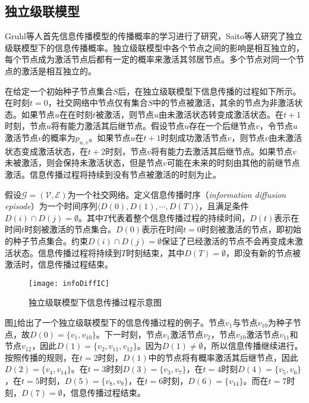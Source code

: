 \subsection{独立级联模型}
\label{subsec5:icModel}
Gruhl等人首先信息传播模型的传播概率的学习进行了研究，Saito等人研究了独立级联模型下的信息传播概率。独立级联模型中各个节点之间的影响是相互独立的，每个节点成为激活节点后都有一定的概率来激活其邻居节点。多个节点对同一个节点的激活是相互独立的。

在给定一个初始种子节点集合$S$后，在独立级联模型下信息传播的过程如下所示。在时刻$t=0$，社交网络中节点仅有集合$S$中的节点被激活，其余的节点为非激活状态。如果节点$u$在在时刻$t$被激活，则节点$u$由未激活状态转变成激活状态。在$t+1$时刻，节点$u$将有能力激活其后继节点。假设节点$u$存在一个后继节点$v$，令节点$u$激活节点$v$的概率为$p_{u,v}$。如果节点$u$在$t+1$时刻成功激活节点$v$，则节点$v$由未激活状态变成激活状态，在$t+2$时刻，节点$v$将有能力去激活其后继节点。如果节点$v$未被激活，则会保持未激活状态，但是节点$v$可能在未来的时刻由其他的前继节点激活。信息传播过程将持续到没有节点被激活的时刻为止。

假设$\mathcal{G}=\left(\mathcal{V},\mathcal{E}\right)$为一个社交网络。定义信息传播时序（\textit{information diffusion episode}）为一个时间序列$\langle D\left(0\right), D\left(1\right), \cdots, D\left(T\right) \rangle$，且满足条件$D\left(i\right) \cap D\left(j\right) = \emptyset$。其中$T$代表着整个信息传播过程的持续时间，$D\left(t\right)$表示在时间$t$时刻被激活的节点集合。$D\left(0\right)$表示在时间$t=0$时刻被激活的节点，即初始的种子节点集合。约束$D\left(i\right) \cap D\left(j\right) = \emptyset$保证了已经激活的节点不会再变成未激活状态。信息传播过程将持续到$T$时刻结束，其中$D\left(T\right) = \emptyset$，即没有新的节点被激活时，信息传播过程结束。

\begin{figure}[!ht]
    \centering
    \texttt{[image: infoDiffIC]}
    \caption{独立级联模型下信息传播过程示意图}
    \label{fig:infoDiffIC}
\end{figure}

图\ref{fig:infoDiffIC}给出了一个独立级联模型下的信息传播过程的例子。节点$v_1$与节点$v_{10}$为种子节点，故$D\left(0\right)=\{v_1,v_{10}\}$。下一时刻，节点$v_1$激活节点$v_2$，节点$v_{10}$激活节点$v_{11}$和节点$v_{12}$，因此$D\left(1\right)=\{v_2,v_{11},v_{12}\}$。因为$D\left(1\right) \neq \emptyset$，所以信息传播继续进行。按照传播的规则，在$t=2$时刻，$D\left(1\right)$中的节点将有概率激活其后继节点，因此$D\left(2\right)=\{v_4,v_{14}\}$。在$t=3$时刻$D\left(3\right)=\{v_3,v_7\}$，在$t=4$时刻$D\left(4\right)=\{v_5,v_6\}$，在$t=5$时刻，$D\left(5\right)=\{v_8,v_9\}$，在$t=6$时刻，$D\left(6\right)=\{v_{14}\}$。而在$t=7$时刻，$D\left(7\right)=\emptyset$，信息传播过程结束。

